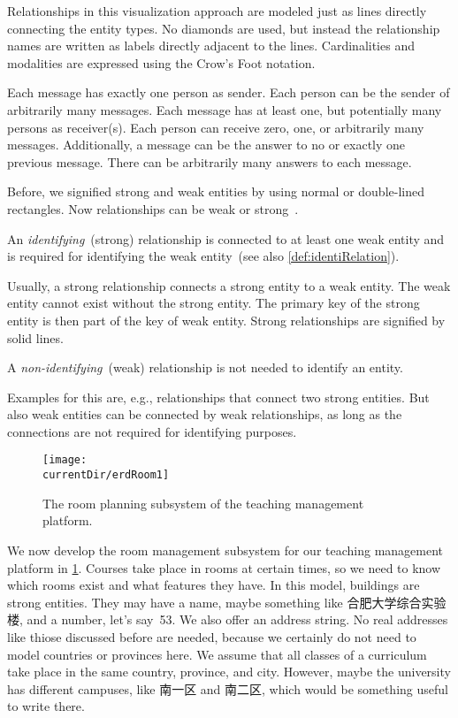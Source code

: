 Relationships in this visualization approach are modeled just as lines directly connecting the entity types.
No diamonds are used, but instead the relationship names are written as labels directly adjacent to the lines.
Cardinalities and modalities are expressed using the Crow's Foot notation.

Each message has exactly one person as sender.
Each person can be the sender of arbitrarily many messages.
Each message has at least one, but potentially many persons as receiver(s).
Each person can receive zero, one, or arbitrarily many messages.
Additionally, a message can be the answer to no or exactly one previous message.
There can be arbitrarily many answers to each message.

Before, we signified strong and weak entities by using normal or double-lined rectangles.
Now relationships can be weak or strong~\cite{P2024C6DS:EM}.%
%
\begin{definition}%
An \emph{identifying}~(strong) relationship is connected to at least one weak entity and is required for identifying the weak entity~(see also \cref{def:identiRelation}). %
\end{definition}%
%
Usually, a strong relationship connects a strong entity to a weak entity.
The weak entity cannot exist without the strong entity.
The primary key of the strong entity is then part of the key of weak entity.
Strong relationships are signified by solid lines.%
%
\begin{definition}%
A \emph{non-identifying}~(weak) relationship is not needed to identify an entity.%
\end{definition}%
Examples for this are, e.g., relationships that connect two strong entities.
But also weak entities can be connected by weak relationships, as long as the connections are not required for identifying purposes.

\begin{figure}%
\centering%
\texttt{[image: \\currentDir/erdRoom1]}%
\caption{The room planning subsystem of the teaching management platform.}%
\label{fig:erdRoom1}%
\end{figure}%
%
We now develop the room management subsystem for our teaching management platform in \cref{fig:erdRoom1}.
Courses take place in rooms at certain times, so we need to know which rooms exist and what features they have.
In this model, buildings are strong entities.
They may have a name, maybe something like 合肥大学综合实验楼, and a number, let's say~53.
We also offer an address string.
No real addresses like thiose discussed before are needed, because we certainly do not need to model countries or provinces here.
We assume that all classes of a curriculum take place in the same country, province, and city.
However, maybe the university has different campuses, like 南一区 and 南二区, which would be something useful to write there.

